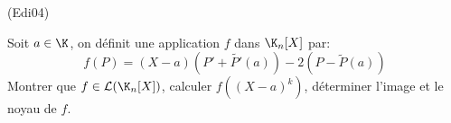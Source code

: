 \begin{tiny}(Edi04)\end{tiny} Soit $a\in \K$, on définit une application $f$ dans $\K_n[X]$ par:
\begin{displaymath}
  f(P) = (X-a)(P'+\widetilde{P'}(a)) -2(P-\widetilde{P}(a))
\end{displaymath}
Montrer que $f\in\mathcal{L}(\K_n[X])$, calculer $f((X-a)^k)$, déterminer l'image et le noyau de $f$.